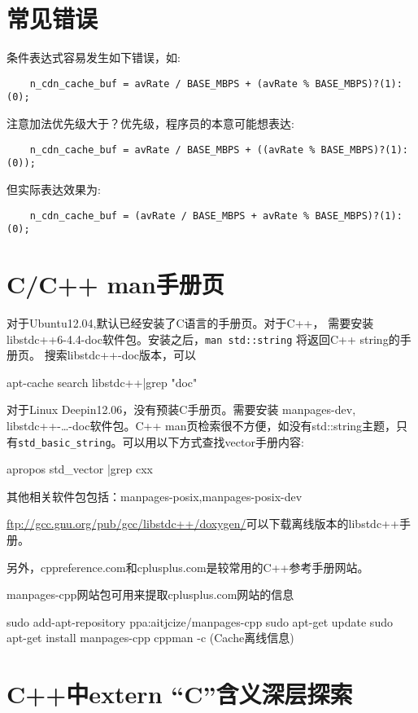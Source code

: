 \section{常见错误}

条件表达式容易发生如下错误，如:
\begin{verbatim}
    n_cdn_cache_buf = avRate / BASE_MBPS + (avRate % BASE_MBPS)?(1):(0);
\end{verbatim}
注意加法优先级大于？优先级，程序员的本意可能想表达:
\begin{verbatim}
    n_cdn_cache_buf = avRate / BASE_MBPS + ((avRate % BASE_MBPS)?(1):(0));
\end{verbatim}
但实际表达效果为:

\begin{verbatim}
    n_cdn_cache_buf = (avRate / BASE_MBPS + avRate % BASE_MBPS)?(1):(0);
\end{verbatim}


\section{C/C++ man手册页}
对于Ubuntu12.04,默认已经安装了C语言的手册页。对于C++，
需要安装libstdc++6-4.4-doc软件包。安装之后，\verb+man std::string+
将返回C++ string的手册页。
搜索libstdc++-doc版本，可以
\begin{shellcmd}
	apt-cache search libstdc++|grep "doc"
\end{shellcmd}


对于Linux Deepin12.06，没有预装C手册页。需要安装
manpages-dev, libstdc++-\ldots-doc软件包。C++ man页检索很不方便，如没有std::string主题，只有\verb+std_basic_string+。可以用以下方式查找vector手册内容:
\begin{shellcmd}
	apropos std_vector |grep cxx
\end{shellcmd}

其他相关软件包包括：manpages-posix,manpages-posix-dev

\url{ftp://gcc.gnu.org/pub/gcc/libstdc++/doxygen/}可以下载离线版本的libstdc++手册。

另外，cppreference.com和cplusplus.com是较常用的C++参考手册网站。

manpages-cpp网站包可用来提取cplusplus.com网站的信息
\begin{shellcmd}
	sudo add-apt-repository ppa:aitjcize/manpages-cpp
	sudo apt-get update
	sudo apt-get install manpages-cpp
	cppman -c (Cache离线信息)
\end{shellcmd}


\section{C++中extern “C”含义深层探索}
